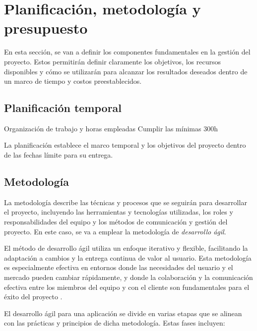 \section{Planificación, metodología y presupuesto}

En esta sección, se van a definir los componentes fundamentales en la gestión del proyecto. Estos permitirán definir claramente los objetivos, los recursos disponibles y cómo se utilizarán para alcanzar los resultados deseados dentro de un marco de tiempo y costos preestablecidos.

\subsection{Planificación temporal}

Organización de trabajo y horas empleadas
Cumplir las mínimas 300h

La planificación establece el marco temporal y los objetivos del proyecto dentro de las fechas límite para su entrega. 

\subsection{Metodología}

La metodología describe las técnicas y procesos que se seguirán para desarrollar el proyecto, incluyendo las herramientas y tecnologías utilizadas, los roles y responsabilidades del equipo y los métodos de comunicación y gestión del proyecto. En este caso, se va a emplear la metodología de \textit{desarrollo ágil}.

El método de desarrollo ágil utiliza un enfoque iterativo y flexible, facilitando la adaptación a cambios y la entrega continua de valor al usuario. Esta metodología es especialmente efectiva en entornos donde las necesidades del usuario y el mercado pueden cambiar rápidamente, y donde la colaboración y la comunicación efectiva entre los miembros del equipo y con el cliente son fundamentales para el éxito del proyecto \parencite{metodologiaAgil}.

El desarrollo ágil para una aplicación se divide en varias etapas que se alinean con las prácticas y principios de dicha metodología. Estas fases incluyen:

